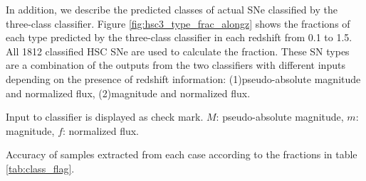 \documentclass[useamsfonts]{pasj01}
\begin{document}
In addition, we describe the predicted classes of actual SNe classified by the three-class classifier.
Figure \ref{fig:hsc3_type_frac_alongz} shows the fractions of each type predicted by the three-class classifier in each redshift from 0.1 to 1.5.
All 1812 classified HSC SNe are used to calculate the fraction.
These SN types are a combination of the outputs from the two classifiers with different inputs depending on the presence of redshift information: (1)pseudo-absolute magnitude and normalized flux, (2)magnitude and normalized flux.

%
%
%
%
\begin{table}[htbp]
\label{tab:h3_validation}
\begin{tabnote}
\footnotemark[$*$] Input to classifier is displayed as check mark. $M$: pseudo-absolute magnitude, $m$: magnitude, $f$: normalized flux.

\footnotemark[$\dagger$] %
Accuracy of samples extracted from each case according to the fractions in table \ref{tab:class_flag}.
\end{tabnote}
\end{table}
\end{document}
